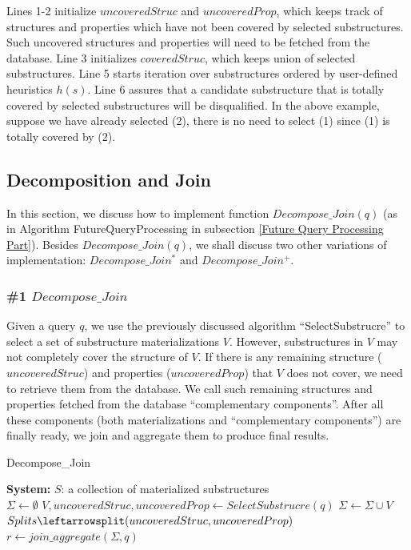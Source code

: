 Lines 1-2 initialize $uncoveredStruc$ and $uncoveredProp$, which keeps track of structures and properties which have not been covered by selected substructures. Such uncovered structures and properties will need to be fetched from the database. Line 3 initializes $coveredStruc$, which keeps union of selected substructures. Line 5 starts iteration over substructures ordered by user-defined heuristics $h(s)$. Line 6 assures that a candidate substructure that is totally covered by selected substructures will be disqualified. In the above example, suppose we have already selected (2), there is no need to select (1) since (1) is totally covered by (2).

\subsection{Decomposition and Join}
\label{Query Decomposition}
In this section, we  discuss how to implement function $Decompose\_Join(q)$ (as in Algorithm FutureQueryProcessing in subsection \ref{Future Query Processing Part}). Besides $Decompose\_Join(q)$, we shall discuss two other variations of implementation: $Decompose\_Join^{*}$ and $Decompose\_Join^{+}$.

\subsubsection{\#1 $Decompose\_Join$}
Given a query $q$, we use the previously discussed algorithm ``SelectSubstrucre'' to select a set of substructure materializations $V$. However, substructures in $V$ may not completely cover the structure of $V$. If there is any remaining structure ($uncoveredStruc$) and properties ($uncoveredProp$) that $V$ does not cover, we need to retrieve them from the database. We call such remaining structures and properties fetched from the database ``complementary  components''. After all these components (both materializations and ``complementary  components'') are finally ready, we join and aggregate them to produce final results.

\begin{algorithm}[H]
\caption{Decompose\_Join}
\LinesNumbered
\textbf{System:} $S$: a collection of materialized substructures\\
$\Sigma \gets \emptyset $\;
$V, uncoveredStruc, uncoveredProp \gets SelectSubstrucre(q) $\;
$\Sigma \gets \Sigma \cup V $\;
$Splits\leftarrowsplit(uncoveredStruc, uncoveredProp)$\;
$r \leftarrow join\_aggregate(\Sigma, q)$\;
\end{algorithm}

